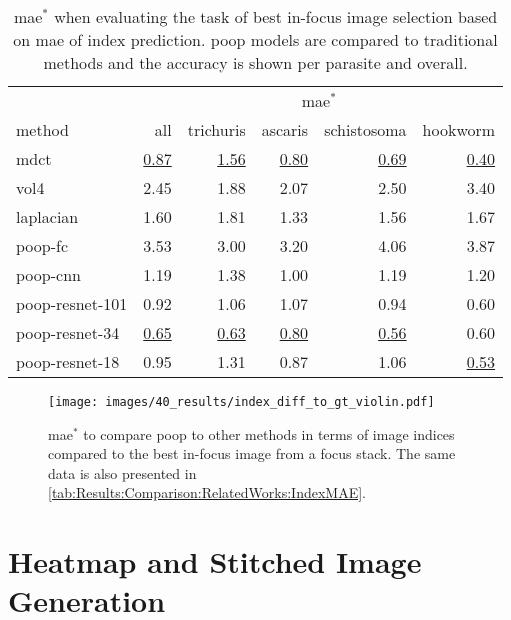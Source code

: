 \begin{table}
    \centering
    \caption[In-focus selection \ac{mae}$^*$]{\ac{mae}$^*$ when evaluating the task of best in-focus image selection based on \ac{mae} of index prediction. \Acs{poop} models are compared to traditional methods and the accuracy is shown per parasite and overall.}
    \begin{tabular}{lrrrrr}
        \hline
        \multicolumn{1}{c}{} & \multicolumn{5}{c}{\ac{mae}$^*$} \\
        \cline{2-6}
        method & all & trichuris & ascaris & schistosoma & hookworm \\
        \hline
        \acs{mdct}      & \underline{0.87} & \underline{1.56} & \underline{0.80} & \underline{0.69} & \underline{0.40} \\
        \acs{vol4}      & 2.45 & 1.88 & 2.07 & 2.50 & 3.40 \\
        \acs{laplacian} & 1.60 & 1.81 & 1.33 & 1.56 & 1.67 \\
        \hline
        \acs{poop}-\acs{fc}              & 3.53 & 3.00 & 3.20 & 4.06 & 3.87 \\
        \acs{poop}-\acs{cnn}             & 1.19 & 1.38 & 1.00 & 1.19 & 1.20 \\
        \acs{poop}-\acs{resnet}-101      & 0.92 & 1.06 & 1.07 & 0.94 & 0.60 \\
        \acs{poop}-\acs{resnet}-34       & \underline{0.65} & \underline{0.63} & \underline{0.80} & \underline{0.56} & 0.60 \\
        \acs{poop}-\acs{resnet}-18       & 0.95 & 1.31 & 0.87 & 1.06 & \underline{0.53} \\
    \end{tabular}
    \label{tab:Results:Comparison:RelatedWorks:IndexMAE}
\end{table}

\begin{figure}
    \centering
    \texttt{[image: images/40\_results/index\_diff\_to\_gt\_violin.pdf]}
    \caption[In-focus selection \ac{mae}$^*$]{\ac{mae}$^*$ to compare \acs{poop} to other methods in terms of image indices compared to the best in-focus image from a focus stack. The same data is also presented in \autoref{tab:Results:Comparison:RelatedWorks:IndexMAE}.}
    \label{fig:Results:Comparison:RelatedWorks:IndexMAE}
\end{figure}

\FloatBarrier

\section{Heatmap and Stitched Image Generation}
\label{sec:Results:HeatStiched}

